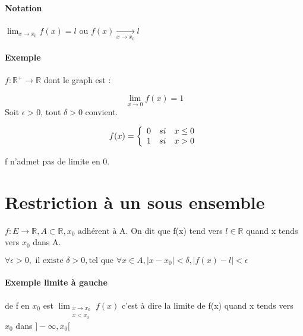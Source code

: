 \paragraph{Notation} $\lim_{x \to x_0} f(x) = l$ ou $f(x) \xrightarrow[x \to x_0]{} l$
\newpage
\paragraph{Exemple} $ f:\mathbb{R}^+ \rightarrow \mathbb{R}$ dont le graph est :


\[ \lim_{x \to 0} f(x) = 1\] Soit $\epsilon > 0$, tout $\delta > 0$ convient.

\begin{wrapfigure}[0]{r}{0pt}
\end{wrapfigure}

\[f(x) = 
\left\{
\begin{array}{r c l}
	0 & si & x \leq 0 \\
	1 & si & x > 0
\end{array}
\right.
\]

f n'admet pas de limite en 0.

\section{Restriction à un sous ensemble}
$f : E \rightarrow \mathbb{R}, A \subset \mathbb{R}, x_0 \text{ adhérent à A.}$
On dit que f(x) tend vers $l \in \mathbb{R}$ quand x tends vers $x_0$ dans A.

$\forall \epsilon > 0, \text{ il existe } \delta > 0,  \text{tel que } \forall x \in A,|x-x_0| < \delta, |f(x) - l| < \epsilon$

\paragraph{Exemple limite à gauche} de f en $x_0$ est $\lim_{\substack {x \to x_0 \\ x < x_0}} f(x)$ c'est à dire la limite de f(x) quand x tends vers $x_0$ dans $]-\infty, x_0[$
